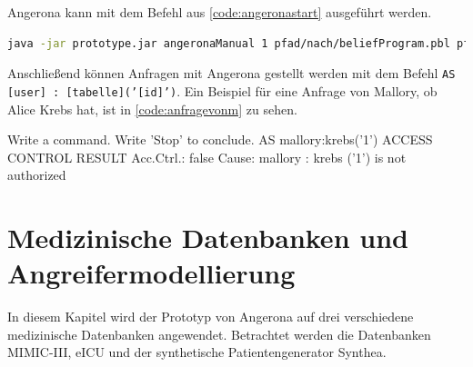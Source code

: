 \documentclass[german,version-2020-11]{uzl-thesis}
\begin{document}
Angerona kann mit dem Befehl aus \autoref{code:angeronastart} ausgeführt werden.
\begin{lstlisting}[language=bash, caption = {Angerona: Startbefehl}, label={code:angeronastart}]
java -jar prototype.jar angeronaManual 1 pfad/nach/beliefProgram.pbl pfad/nach/initStatements.txt pfad/nach/template.cpt
\end{lstlisting}
Anschließend können Anfragen mit Angerona gestellt werden mit dem Befehl \texttt{AS [user] : [tabelle]('[id]')}. Ein Beispiel für eine Anfrage von Mallory, ob Alice Krebs hat, ist in \autoref{code:anfragevonm} zu sehen.

\begin{Pseudocode}[caption={Angerona: Anfrage von Mallory, ob Alice Krebs hat } , label = {code:anfragevonm}]
Write a command. Write 'Stop' to conclude.
AS mallory:krebs('1')
ACCESS CONTROL RESULT
Acc.Ctrl.: false Cause: mallory : krebs ('1') is not authorized
\end{Pseudocode}

\chapter{Medizinische Datenbanken und Angreifermodellierung}\label{chap:Modellierung}
In diesem Kapitel wird der Prototyp von Angerona auf drei verschiedene medizinische Datenbanken angewendet. Betrachtet werden die Datenbanken MIMIC-III, eICU und der synthetische Patientengenerator Synthea.
\end{document}
